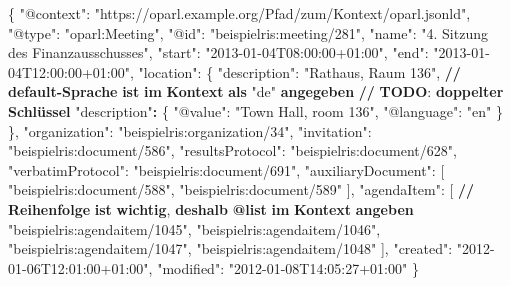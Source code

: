 \documentclass[,a4paper]{article}
\newenvironment{Shaded}{}{}
\newcommand{\DataTypeTok}[1]{\textcolor[rgb]{0.56,0.13,0.00}{{#1}}}
\newcommand{\StringTok}[1]{\textcolor[rgb]{0.25,0.44,0.63}{{#1}}}
\newcommand{\OtherTok}[1]{\textcolor[rgb]{0.00,0.44,0.13}{{#1}}}
\newcommand{\FunctionTok}[1]{\textcolor[rgb]{0.02,0.16,0.49}{{#1}}}
\newcommand{\ErrorTok}[1]{\textcolor[rgb]{1.00,0.00,0.00}{\textbf{{#1}}}}
\begin{document}
\begin{Shaded}
\begin{Highlighting}[]
\FunctionTok{\{}
    \DataTypeTok{"@context"}\FunctionTok{:} \StringTok{"https://oparl.example.org/Pfad/zum/Kontext/oparl.jsonld"}\FunctionTok{,}
    \DataTypeTok{"@type"}\FunctionTok{:} \StringTok{"oparl:Meeting"}\FunctionTok{,}
    \DataTypeTok{"@id"}\FunctionTok{:} \StringTok{"beispielris:meeting/281"}\FunctionTok{,}
    \DataTypeTok{"name"}\FunctionTok{:} \StringTok{"4. Sitzung des Finanzausschusses"}\FunctionTok{,}
    \DataTypeTok{"start"}\FunctionTok{:} \StringTok{"2013-01-04T08:00:00+01:00"}\FunctionTok{,}
    \DataTypeTok{"end"}\FunctionTok{:} \StringTok{"2013-01-04T12:00:00+01:00"}\FunctionTok{,}
    \DataTypeTok{"location"}\FunctionTok{:} \FunctionTok{\{}
        \DataTypeTok{"description"}\FunctionTok{:} \StringTok{"Rathaus, Raum 136"}\FunctionTok{,}
            \ErrorTok{//} \ErrorTok{default-Sprache} \ErrorTok{ist} \ErrorTok{im} \ErrorTok{Kontext} \ErrorTok{als} \DataTypeTok{"de"} \ErrorTok{angegeben}
            \ErrorTok{//} \ErrorTok{TODO}\FunctionTok{:} \ErrorTok{doppelter} \ErrorTok{Schlüssel}
        \StringTok{"description"}\ErrorTok{:} \FunctionTok{\{}
            \DataTypeTok{"@value"}\FunctionTok{:} \StringTok{"Town Hall, room 136"}\FunctionTok{,}
            \DataTypeTok{"@language"}\FunctionTok{:} \StringTok{"en"}
        \FunctionTok{\}}
    \FunctionTok{\},}
    \DataTypeTok{"organization"}\FunctionTok{:} \StringTok{"beispielris:organization/34"}\FunctionTok{,}
    \DataTypeTok{"invitation"}\FunctionTok{:} \StringTok{"beispielris:document/586"}\FunctionTok{,}
    \DataTypeTok{"resultsProtocol"}\FunctionTok{:} \StringTok{"beispielris:document/628"}\FunctionTok{,}
    \DataTypeTok{"verbatimProtocol"}\FunctionTok{:} \StringTok{"beispielris:document/691"}\FunctionTok{,}
    \DataTypeTok{"auxiliaryDocument"}\FunctionTok{:} \OtherTok{[}
        \StringTok{"beispielris:document/588"}\OtherTok{,}
        \StringTok{"beispielris:document/589"}
    \OtherTok{]}\FunctionTok{,}
    \DataTypeTok{"agendaItem"}\FunctionTok{:} \OtherTok{[}
    \ErrorTok{//} \ErrorTok{Reihenfolge} \ErrorTok{ist} \ErrorTok{wichtig}\OtherTok{,} \ErrorTok{deshalb} \ErrorTok{@list} \ErrorTok{im} \ErrorTok{Kontext} \ErrorTok{angeben}
        \StringTok{"beispielris:agendaitem/1045"}\OtherTok{,}
        \StringTok{"beispielris:agendaitem/1046"}\OtherTok{,}
        \StringTok{"beispielris:agendaitem/1047"}\OtherTok{,}
        \StringTok{"beispielris:agendaitem/1048"}
    \OtherTok{]}\FunctionTok{,}
    \DataTypeTok{"created"}\FunctionTok{:} \StringTok{"2012-01-06T12:01:00+01:00"}\FunctionTok{,}
    \DataTypeTok{"modified"}\FunctionTok{:} \StringTok{"2012-01-08T14:05:27+01:00"}
\FunctionTok{\}}
\end{Highlighting}
\end{Shaded}
\end{document}
